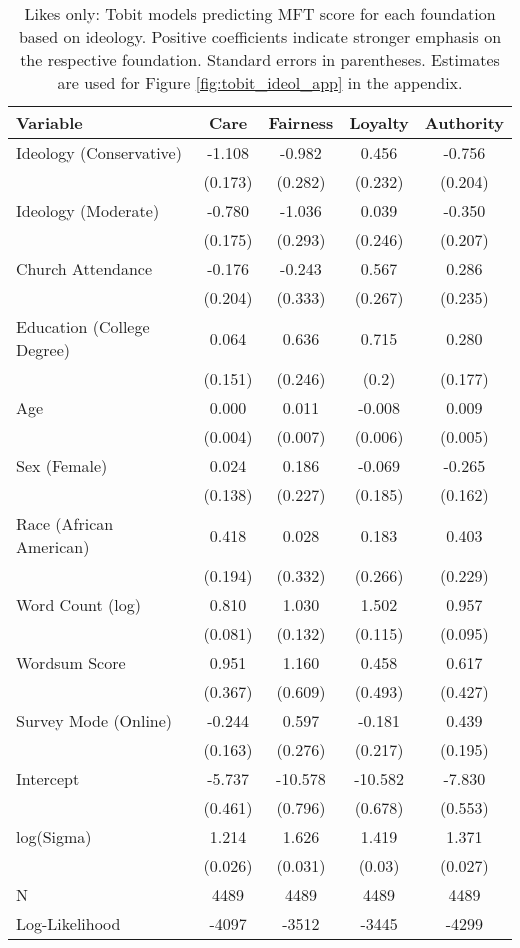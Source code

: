 \begin{table}[ht]
\centering
\caption[Likes only: Tobit models predicting MFT score for each foundation based 
           on ideology]{Likes only: Tobit models predicting MFT score for each foundation based 
           on ideology. Positive coefficients indicate stronger emphasis on the respective 
           foundation. Standard errors in parentheses. Estimates are used for 
           Figure \ref{fig:tobit_ideol_app} in the appendix.} 
\label{tab:tobit_like}
\begingroup\footnotesize
\begin{tabular}{lcccc}
  \hline
Variable & Care & Fairness & Loyalty & Authority \\ 
  \hline
Ideology (Conservative) & -1.108 &  -0.982 &   0.456 & -0.756 \\ 
   & (0.173) & (0.282) & (0.232) & (0.204) \\ 
  Ideology (Moderate) & -0.780 &  -1.036 &   0.039 & -0.350 \\ 
   & (0.175) & (0.293) & (0.246) & (0.207) \\ 
  Church Attendance & -0.176 &  -0.243 &   0.567 &  0.286 \\ 
   & (0.204) & (0.333) & (0.267) & (0.235) \\ 
  Education (College Degree) &  0.064 &   0.636 &   0.715 &  0.280 \\ 
   & (0.151) & (0.246) & (0.2) & (0.177) \\ 
  Age &  0.000 &   0.011 &  -0.008 &  0.009 \\ 
   & (0.004) & (0.007) & (0.006) & (0.005) \\ 
  Sex (Female) &  0.024 &   0.186 &  -0.069 & -0.265 \\ 
   & (0.138) & (0.227) & (0.185) & (0.162) \\ 
  Race (African American) &  0.418 &   0.028 &   0.183 &  0.403 \\ 
   & (0.194) & (0.332) & (0.266) & (0.229) \\ 
  Word Count (log) &  0.810 &   1.030 &   1.502 &  0.957 \\ 
   & (0.081) & (0.132) & (0.115) & (0.095) \\ 
  Wordsum Score &  0.951 &   1.160 &   0.458 &  0.617 \\ 
   & (0.367) & (0.609) & (0.493) & (0.427) \\ 
  Survey Mode (Online) & -0.244 &   0.597 &  -0.181 &  0.439 \\ 
   & (0.163) & (0.276) & (0.217) & (0.195) \\ 
  Intercept & -5.737 & -10.578 & -10.582 & -7.830 \\ 
   & (0.461) & (0.796) & (0.678) & (0.553) \\ 
  log(Sigma) &  1.214 &   1.626 &   1.419 &  1.371 \\ 
   & (0.026) & (0.031) & (0.03) & (0.027) \\ 
   \hline
N & 4489 & 4489 & 4489 & 4489 \\ 
  Log-Likelihood & -4097 & -3512 & -3445 & -4299 \\ 
   \hline
\end{tabular}
\endgroup
\end{table}
